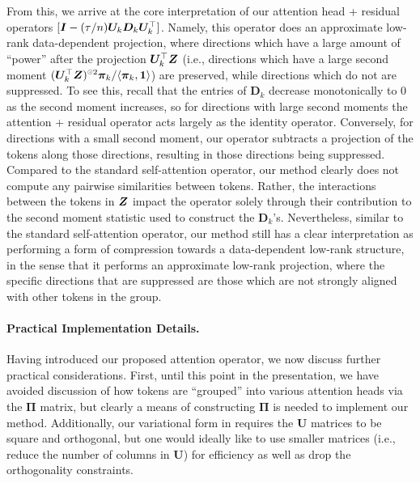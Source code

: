 \documentclass[../../book-main.tex]{subfiles}
\begin{document}
From this, we arrive at the core interpretation of our attention head + residual
operators $[\bm{I} - (\tau/n)\bm U_{k}\bm D_{k}\bm U_{k}^{\top}]$.  Namely, this
operator does an approximate low-rank data-dependent projection, where
directions which have a large amount of ``power'' after the projection $\bm
U_k^\top \bm{Z}$ (i.e., directions which have a large second moment $(\bm
U_{k}^{\top}\Z)^{\hada 2}\bm \pi_k / \langle \bm \pi_{k}, \bm 1\rangle$) are preserved, while directions which do not are suppressed. To see this, recall that the entries of $\bm D_k$ decrease monotonically to 0 as the second moment increases, so for directions with large second moments the attention + residual operator acts largely as the identity operator.  Conversely, for directions with a small second moment, our operator subtracts a projection of the tokens along those directions, resulting in those directions being suppressed. Compared to the standard self-attention operator, our method clearly does not compute any pairwise similarities between tokens. Rather, the interactions between the tokens in $\bm{Z}$ impact the operator solely through their contribution to the second moment statistic used to construct the $\bm D_{k}$'s.  Nevertheless, similar to the standard self-attention operator, our method still has a clear interpretation as performing a form of compression towards a data-dependent low-rank structure, in the sense that it performs an approximate low-rank projection, where the specific directions that are suppressed are those which are not strongly aligned with other tokens in the group.

\paragraph{Practical Implementation Details.} Having introduced our proposed attention operator, we now discuss further practical considerations.  First, until this point in the presentation, we have avoided discussion of how tokens are ``grouped'' into various attention heads via the $\bm\Pi$ matrix, but clearly a means of constructing $\bm\Pi$ is needed to implement our method.  Additionally, our variational form in  requires the $\bm U$ matrices to be square and orthogonal, but one would ideally like to use smaller matrices (i.e., reduce the number of columns in $\bm U$) for efficiency as well as drop the orthogonality constraints. 
\end{document}
